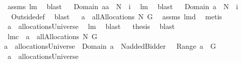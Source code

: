 \begin{isabellebody}
\ assms{\isacharparenleft}{}{\isacharparenright}\ lm{}{}\ \isamarkupfalse%
\ blast\isanewline
{}\isamarkupfalse%
\ \isamarkupfalse%
\ {\isachardoublequoteopen}Domain\ aa\ {\isasymsubseteq}\ N\ {\isasymunion}\ {\isacharbraceleft}{\isacharquery}i{\isacharbraceright}{\isachardoublequoteclose}\ \isamarkupfalse%
\ lm{}{}\ \isamarkupfalse%
\ blast\isanewline
{}\isamarkupfalse%
\ \isamarkupfalse%
\ {\isachardoublequoteopen}Domain\ a\ {\isasymsubseteq}\ N\ {\isacharminus}\ {\isacharbraceleft}{\isacharquery}i{\isacharbraceright}{\isachardoublequoteclose}\ \isamarkupfalse%
\ {}\ Outside{\isacharunderscore}def\ \isamarkupfalse%
\ blast\isanewline
{}\isamarkupfalse%
\ \isamarkupfalse%
\ {\isachardoublequoteopen}a\ {\isasymin}\ allAllocations{\isacharprime}\ N\ G{\isachardoublequoteclose}\ \isamarkupfalse%
\ assms\ lm{}{}d\ \isamarkupfalse%
\ metis\isanewline
{}\isamarkupfalse%
\ \isamarkupfalse%
\ \isamarkupfalse%
\ {\isachardoublequoteopen}a\ {\isasymin}\ allocationsUniverse{\isachardoublequoteclose}\ \isamarkupfalse%
\ lm{}{}\ \isamarkupfalse%
\ blast\isanewline
{}\isamarkupfalse%
\ \isamarkupfalse%
\ {\isacharquery}thesis\ \isamarkupfalse%
\ blast\isanewline
{}\isamarkupfalse%
%
\endisatagproof
{\isafoldproof}%
%
\isadelimproof
\isanewline
%
\endisadelimproof
\isanewline
{}\isamarkupfalse%
\ lm{}{}c{\isacharcolon}\ \ {\isachardoublequoteopen}a\ {\isasymin}\ allAllocations{\isacharprime}{\isacharprime}{\isacharprime}\ N\ G{\isachardoublequoteclose}\ \ \isanewline
{\isachardoublequoteopen}a\ {\isasymin}\ allocationsUniverse\ {\isacharampersand}\ Domain\ a\ {\isasymsubseteq}\ N{\isacharminus}{\isacharbraceleft}addedBidder{\isacharprime}{\isacharbraceright}\ {\isacharampersand}\ {\isasymUnion}\ Range\ a\ {\isasymsubseteq}\ G{\isachardoublequoteclose}\isanewline
%
\isadelimproof
%
\endisadelimproof
%
\isatagproof
{}\isamarkupfalse%
\ {\isacharminus}\isanewline
{}\isamarkupfalse%
\ {\isachardoublequoteopen}a\ {\isasymin}\ allocationsUniverse{\isachardoublequoteclose}\ \isamarkupfalse%

\end{isabellebody}

